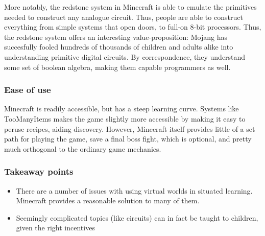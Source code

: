 More notably, the redstone system in Minecraft is able to emulate the primitives
needed to construct any analogue circuit. Thus, people are able to construct
everything from simple systems that open doors, to full-on 8-bit
processors\cite{minecraftutube}. Thus, the redstone system offers an interesting
value-proposition: Mojang has succesfully fooled hundreds of thousands of 
children and adults alike into understanding primitive digital
circuits. By correspondence, they understand some set of boolean algebra, making
them capable programmers as well.

\subsubsection{Ease of use}

Minecraft is readily accessible, but has a steep learning 
curve\cite{minecraftign}. Systems like TooManyItems\cite{toomanyitems} makes 
the game slightly more accessible by making it easy to peruse recipes, aiding 
discovery. However, Minecraft itself provides little of a set path for playing 
the game, save a final boss fight, which is optional, and pretty much 
orthogonal to the ordinary game mechanics.

\subsubsection{Takeaway points}

\begin{itemize}
\item There are a number of issues with using virtual worlds in situated
  learning. Minecraft provides a reasonable solution to many of them.
\item Seemingly complicated topics (like circuits) can in fact be taught to
  children, given the right incentives 
\end{itemize}
